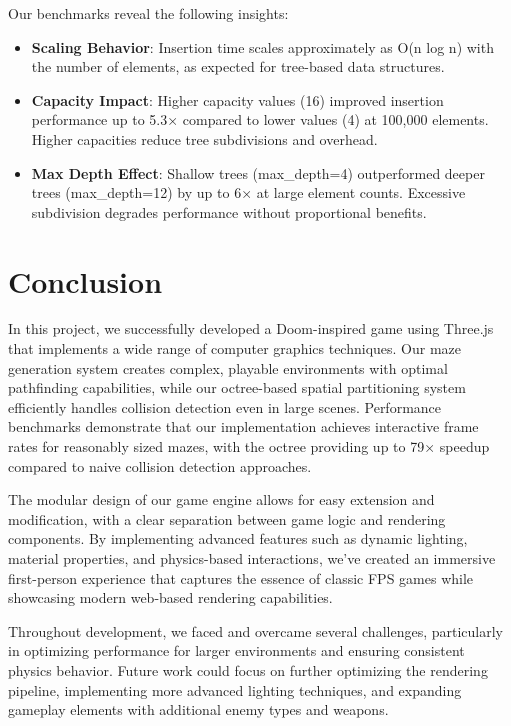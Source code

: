 \documentclass{article}
\begin{document}
Our benchmarks reveal the following insights:

\begin{itemize}
    \item \textbf{Scaling Behavior}: Insertion time scales approximately as O(n log n) with the number of elements, as expected for tree-based data structures.
    \item \textbf{Capacity Impact}: Higher capacity values (16) improved insertion performance up to 5.3× compared to lower values (4) at 100,000 elements. Higher capacities reduce tree subdivisions and overhead.
    \item \textbf{Max Depth Effect}: Shallow trees (max\_depth=4) outperformed deeper trees (max\_depth=12) by up to 6× at large element counts. Excessive subdivision degrades performance without proportional benefits.
\end{itemize}


\section{Conclusion}
In this project, we successfully developed a Doom-inspired game using Three.js
that implements a wide range of computer graphics techniques. Our maze
generation system creates complex, playable environments with optimal
pathfinding capabilities, while our octree-based spatial partitioning system
efficiently handles collision detection even in large scenes. Performance
benchmarks demonstrate that our implementation achieves interactive frame rates
for reasonably sized mazes, with the octree providing up to 79× speedup
compared to naive collision detection approaches.

The modular design of our game engine allows for easy extension and
modification, with a clear separation between game logic and rendering
components. By implementing advanced features such as dynamic lighting,
material properties, and physics-based interactions, we've created an immersive
first-person experience that captures the essence of classic FPS games while
showcasing modern web-based rendering capabilities.

Throughout development, we faced and overcame several challenges, particularly
in optimizing performance for larger environments and ensuring consistent
physics behavior. Future work could focus on further optimizing the rendering
pipeline, implementing more advanced lighting techniques, and expanding
gameplay elements with additional enemy types and weapons.
\end{document}

